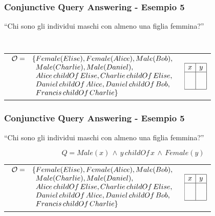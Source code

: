 \documentclass[8pt]{beamer}
\begin{document}
\begin{frame}
\frametitle{Conjunctive Query Answering - Esempio 5}
\begin{center}
``Chi sono gli individui maschi con almeno una figlia femmina?''
\end{center}
\[
 \phantom{Q=Male(x)\,\wedge\,y\,childOf\,x\,\wedge\,Female(y)}
\]
\vspace{\baselineskip}

\begin{tabular}{lc}
$\begin{array}{cl}
  \Ont  =  &  \{Female(Elise), Female(Alice), Male(Bob), \\
  &\phantom{\{}Male(Charlie), Male(Daniel), \\
  &\phantom{\{}Alice\,childOf\,Elise, Charlie\,childOf\,Elise, \\
  &\phantom{\{}Daniel\,childOf\,Alice, Daniel\,childOf\,Bob, \\
  &\phantom{\{}Francis\,childOf\,Charlie \}\\
\end{array}$ & 
$\begin{array}{|c|c|}
  \hline
  x&y\\
  \hline
  &\\
  &\\
  \hline
\end{array}$\\
\end{tabular}
\end{frame}

\begin{frame}
\frametitle{Conjunctive Query Answering - Esempio 5}
\begin{center}
``Chi sono gli individui maschi con almeno una figlia femmina?''
\end{center}
\[
 Q=Male(x)\,\wedge\,y\,childOf\,x\,\wedge\,Female(y)
\]
\vspace{\baselineskip}

\begin{tabular}{lc}
$\begin{array}{cl}
  \Ont  =  &  \{Female(Elise), Female(Alice), Male(Bob), \\
  &\phantom{\{}Male(Charlie), Male(Daniel), \\
  &\phantom{\{}Alice\,childOf\,Elise, Charlie\,childOf\,Elise, \\
  &\phantom{\{}Daniel\,childOf\,Alice, Daniel\,childOf\,Bob, \\
  &\phantom{\{}Francis\,childOf\,Charlie \}\\
\end{array}$ & 
$\begin{array}{|c|c|}
  \hline
  x&y\\
  \hline
  &\\
  &\\
  \hline
\end{array}$\\
\end{tabular}
\end{frame}
\end{document}
